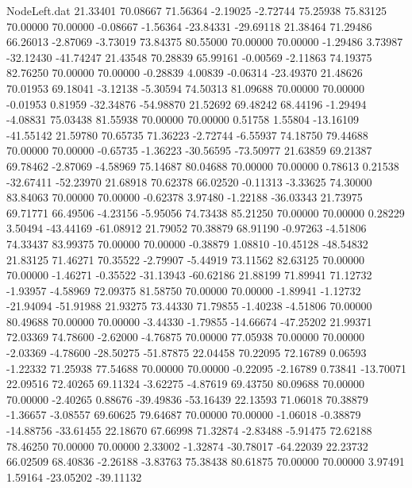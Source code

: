 \begin{filecontents}{NodeLeft.dat}
  21.33401   70.08667   71.56364    -2.19025   -2.72744   75.25938   75.83125   70.00000   70.00000   -0.08667   -1.56364  -23.84331  -29.69118
  21.38464   71.29486   66.26013    -2.87069   -3.73019   73.84375   80.55000   70.00000   70.00000   -1.29486    3.73987  -32.12430  -41.74247
  21.43548   70.28839   65.99161    -0.00569   -2.11863   74.19375   82.76250   70.00000   70.00000   -0.28839    4.00839   -0.06314  -23.49370
  21.48626   70.01953   69.18041    -3.12138   -5.30594   74.50313   81.09688   70.00000   70.00000   -0.01953    0.81959  -32.34876  -54.98870
  21.52692   69.48242   68.44196    -1.29494   -4.08831   75.03438   81.55938   70.00000   70.00000    0.51758    1.55804  -13.16109  -41.55142
  21.59780   70.65735   71.36223    -2.72744   -6.55937   74.18750   79.44688   70.00000   70.00000   -0.65735   -1.36223  -30.56595  -73.50977
  21.63859   69.21387   69.78462    -2.87069   -4.58969   75.14687   80.04688   70.00000   70.00000    0.78613    0.21538  -32.67411  -52.23970
  21.68918   70.62378   66.02520    -0.11313   -3.33625   74.30000   83.84063   70.00000   70.00000   -0.62378    3.97480   -1.22188  -36.03343
  21.73975   69.71771   66.49506    -4.23156   -5.95056   74.73438   85.21250   70.00000   70.00000    0.28229    3.50494  -43.44169  -61.08912
  21.79052   70.38879   68.91190    -0.97263   -4.51806   74.33437   83.99375   70.00000   70.00000   -0.38879    1.08810  -10.45128  -48.54832
  21.83125   71.46271   70.35522    -2.79907   -5.44919   73.11562   82.63125   70.00000   70.00000   -1.46271   -0.35522  -31.13943  -60.62186
  21.88199   71.89941   71.12732    -1.93957   -4.58969   72.09375   81.58750   70.00000   70.00000   -1.89941   -1.12732  -21.94094  -51.91988
  21.93275   73.44330   71.79855    -1.40238   -4.51806   70.00000   80.49688   70.00000   70.00000   -3.44330   -1.79855  -14.66674  -47.25202
  21.99371   72.03369   74.78600    -2.62000   -4.76875   70.00000   77.05938   70.00000   70.00000   -2.03369   -4.78600  -28.50275  -51.87875
  22.04458   70.22095   72.16789     0.06593   -1.22332   71.25938   77.54688   70.00000   70.00000   -0.22095   -2.16789    0.73841  -13.70071
  22.09516   72.40265   69.11324    -3.62275   -4.87619   69.43750   80.09688   70.00000   70.00000   -2.40265    0.88676  -39.49836  -53.16439
  22.13593   71.06018   70.38879    -1.36657   -3.08557   69.60625   79.64687   70.00000   70.00000   -1.06018   -0.38879  -14.88756  -33.61455
  22.18670   67.66998   71.32874    -2.83488   -5.91475   72.62188   78.46250   70.00000   70.00000    2.33002   -1.32874  -30.78017  -64.22039
  22.23732   66.02509   68.40836    -2.26188   -3.83763   75.38438   80.61875   70.00000   70.00000    3.97491    1.59164  -23.05202  -39.11132

\end{filecontents}
